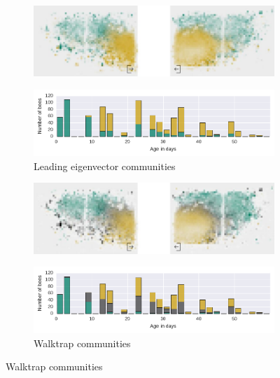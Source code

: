 \begin{figure}[!htb]
	\centering
	\begin{subfigure}[b]{1.0\textwidth}
	\centering
	\includegraphics[width=1.0\textwidth]{Figures/le_network3}
	\end{subfigure}
	
	\begin{subfigure}[b]{1.0\textwidth}
	\centering
	\includegraphics[width=1.0\textwidth]{Figures/n3-ageDistribution-LE}
	\caption[Leading eigenvector communities]{Leading eigenvector communities}
	\label{fig:n3ageLE}
	\end{subfigure}
	
	
	
	\begin{subfigure}[b]{1.0\textwidth}
	\vspace{1pt}
	\centering
	\includegraphics[width=1.0\textwidth]{Figures/wt_network3}
	\end{subfigure}
	
	\begin{subfigure}[b]{1.0\textwidth}
	\centering
	\includegraphics[width=1.0\textwidth]{Figures/n3-ageDistribution-WT}
	\caption[Walktrap communities]{Walktrap communities}
	\label{fig:n3ageWT}
	\end{subfigure}
	

\end{figure}
